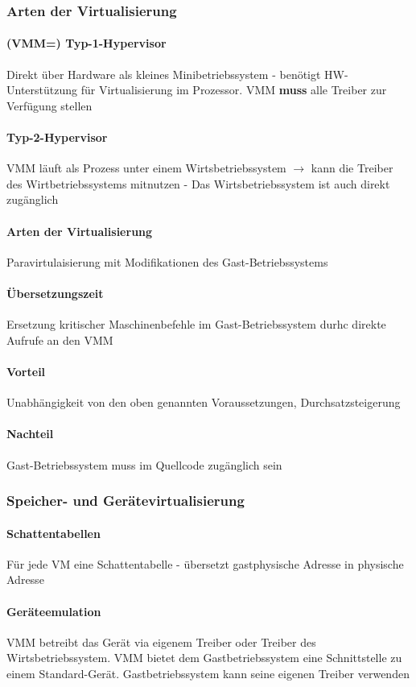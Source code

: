 \documentclass[11pt,a4paper,landscape]{article}
\begin{document}
\begin{multicols*}{3}
	\subsubsection{Arten der Virtualisierung}
	\paragraph{(VMM=) Typ-1-Hypervisor} Direkt über Hardware als kleines Minibetriebssystem - benötigt HW-Unterstützung für Virtualisierung im Prozessor. VMM \textbf{muss} alle Treiber zur Verfügung stellen
	\paragraph{Typ-2-Hypervisor} VMM läuft als Prozess unter einem Wirtsbetriebssystem $\rightarrow$ kann die Treiber des Wirtbetriebssystems mitnutzen - Das Wirtsbetriebssystem ist auch direkt zugänglich
	\paragraph{Arten der Virtualisierung} Paravirtulaisierung mit Modifikationen des Gast-Betriebssystems
	\paragraph{Übersetzungszeit} Ersetzung kritischer Maschinenbefehle im Gast-Betriebssystem durhc direkte Aufrufe an den VMM
	\paragraph{Vorteil} Unabhängigkeit von den oben genannten Voraussetzungen, Durchsatzsteigerung
	\paragraph{Nachteil} Gast-Betriebssystem muss im Quellcode zugänglich sein
	\subsubsection{Speicher- und Gerätevirtualisierung}
	\paragraph{Schattentabellen} Für jede VM eine Schattentabelle - übersetzt gastphysische Adresse in physische Adresse
	\paragraph{Geräteemulation} VMM betreibt das Gerät via eigenem Treiber oder Treiber des Wirtsbetriebssystem. VMM bietet dem Gastbetriebssystem eine Schnittstelle zu einem Standard-Gerät. Gastbetriebssystem kann seine eigenen Treiber verwenden

\end{multicols*}
\end{document}
